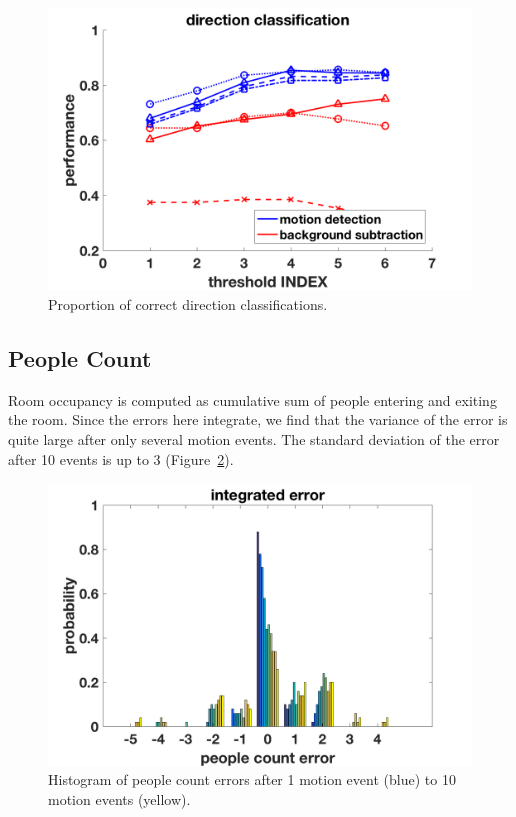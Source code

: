 \documentclass[12pt,oneside]{article} %
\begin{document}
\begin{figure}[htb]
\centering
\includegraphics[scale=0.52]{images/dirClass.png}
\caption{Proportion of correct direction classifications.}
\label{dirclass}
\end{figure}

\subsection{People Count}
Room occupancy is computed as cumulative sum of people entering and exiting the room. Since the errors here
integrate, we find that the variance of the error is quite large after only several motion events.
The standard deviation of the error after 10 events is up to 3 (Figure~\ref{hist}).
\begin{figure}[htb]
\centering
\includegraphics[scale=0.52]{images/pcerror_gamma020_hist.png}
\caption{Histogram of people count errors after 1 motion event (blue) to 10 motion events (yellow).}
\label{hist}
\end{figure}
\end{document}

